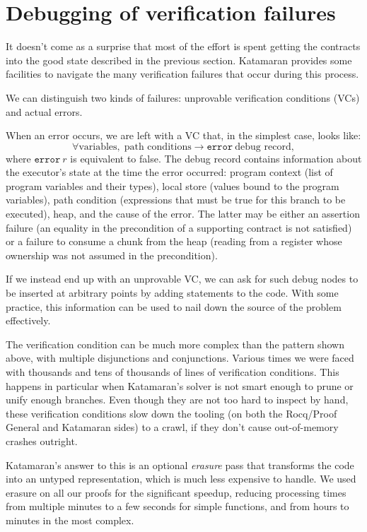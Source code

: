 \section{Debugging of verification failures}

It doesn't come as a surprise that most of the effort is spent getting the contracts into the good state described in the previous section. Katamaran provides some facilities to navigate the many verification failures that occur during this process.

We can distinguish two kinds of failures: unprovable verification conditions (VCs) and actual errors.

When an error occurs, we are left with a VC that, in the simplest case, looks like:
\[ \forall \text{variables},\; \text{path conditions} \to \texttt{error}~\text{debug record}, \]
where \(\texttt{error}~r\) is equivalent to false. The debug record contains information about the executor's state at the time the error occurred: program context (list of program variables and their types), local store (values bound to the program variables), path condition (expressions that must be true for this branch to be executed), heap, and the cause of the error. The latter may be either an assertion failure (\eg an equality in the precondition of a supporting contract is not satisfied) or a failure to consume a chunk from the heap (\eg reading from a register whose ownership was not assumed in the precondition).

If we instead end up with an unprovable VC, we can ask for such debug nodes to be inserted at arbitrary points by adding  statements to the \usail code. With some practice, this information can be used to nail down the source of the problem effectively.

The verification condition can be much more complex than the pattern shown above, with multiple disjunctions and conjunctions. Various times we were faced with thousands and tens of thousands of lines of verification conditions. This happens in particular when Katamaran's solver is not smart enough to prune or unify enough branches. Even though they are not too hard to inspect by hand, these verification conditions slow down the tooling (on both the Rocq/Proof General and Katamaran sides) to a crawl, if they don't cause out-of-memory crashes outright.

Katamaran's answer to this is an optional \emph{erasure} pass that transforms the \usail code into an untyped representation, which is much less expensive to handle. We used erasure on all our proofs for the significant speedup, reducing processing times from multiple minutes to a few seconds for simple functions, and from hours to minutes in the most complex.

